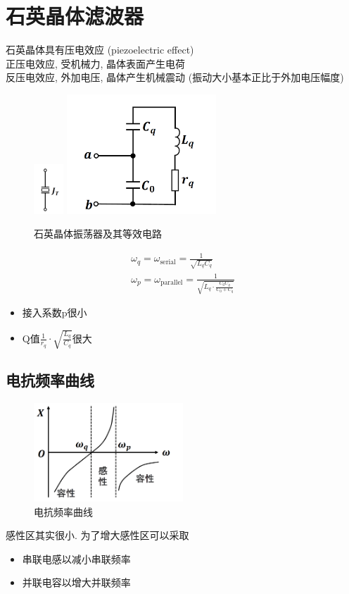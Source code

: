 \documentclass[a4paper]{report}
\begin{document}
\section{石英晶体滤波器}
石英晶体具有压电效应 (piezoelectric effect)\\
正压电效应, 受机械力, 晶体表面产生电荷\\
反压电效应, 外加电压, 晶体产生机械震动 (振动大小基本正比于外加电压幅度)
\begin{figure}[H]
\centering
\includegraphics[width=0.1\textwidth]{crystal_2.png}
\includegraphics[width=0.5\textwidth]{crystal_1.png}
\caption{石英晶体振荡器及其等效电路}
\end{figure}
\begin{align*}
  \omega_q=\omega_{\text{serial}}=\frac{1}{\sqrt{L_q C_q}}\\
  \omega_p=\omega_{\text{parallel}}=\frac{1}{\sqrt{L_q\cdot\frac{C_0 C_q}{C_0+C_q}}}
\end{align*}

\begin{itemize}
  \item 接入系数p很小
  \item Q值$\frac{1}{r_q}\cdot\sqrt{\frac{L_q}{C_q}}$很大
\end{itemize}
\subsection{电抗频率曲线}
\begin{figure}[H]
\centering
\includegraphics[width=0.5\textwidth]{crystal_graph.png}
\caption{电抗频率曲线}
\end{figure}
感性区其实很小. 为了增大感性区可以采取
\begin{itemize}
  \item 串联电感以减小串联频率
  \item 并联电容以增大并联频率
\end{itemize}
\end{document}
